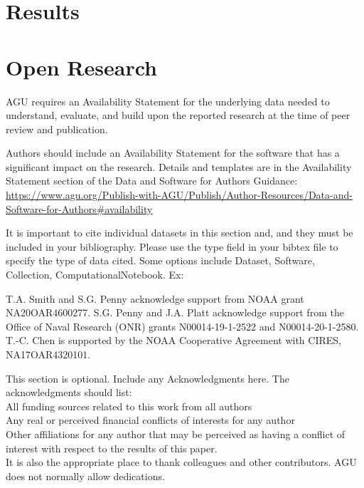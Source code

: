 \documentclass[draft]{agujournal2019}
\begin{document}
%
%


\newpage




\newpage
\section{Results}



%


\newpage
\section{Open Research}
AGU requires an Availability Statement for the underlying data needed to understand, evaluate, and build upon the reported research at the time of peer review and publication.

Authors should include an Availability Statement for the software that has a significant impact on the research. Details and templates are in the Availability Statement section of the Data and Software for Authors Guidance: \url{https://www.agu.org/Publish-with-AGU/Publish/Author-Resources/Data-and-Software-for-Authors#availability}

It is important to cite individual datasets in this section and, and they must be included in your bibliography. Please use the type field in your bibtex file to specify the type of data cited. Some options include Dataset, Software, Collection, ComputationalNotebook. Ex:


\acknowledgments

T.A. Smith and S.G. Penny acknowledge support from NOAA grant NA20OAR4600277. S.G. Penny and J.A. Platt acknowledge support from the Office of Naval Research (ONR) grants N00014-19-1-2522 and N00014-20-1-2580. T.-C. Chen is supported by the NOAA Cooperative Agreement with CIRES, NA17OAR4320101.

This section is optional. Include any Acknowledgments here.
The acknowledgments should list:\\
All funding sources related to this work from all authors\\
Any real or perceived financial conflicts of interests for any author\\
Other affiliations for any author that may be perceived as having a conflict of interest with respect to the results of this paper.\\
It is also the appropriate place to thank colleagues and other contributors. AGU does not normally allow dedications.





%

\end{document}

